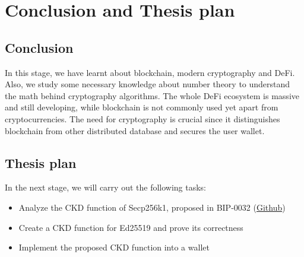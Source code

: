 \chapter{Conclusion and Thesis plan} \label{chap:conclusion}
\minitoc

\section{Conclusion}

In this stage, we have learnt about blockchain, modern cryptography and DeFi. Also, we study some necessary knowledge about number theory to understand the math behind cryptography algorithms. The whole DeFi ecosystem is massive and still developing, while blockchain is not commonly used yet apart from cryptocurrencies. The need for cryptography is crucial since it distinguishes blockchain from other distributed database and secures the user wallet.


\section{Thesis plan}

In the next stage, we will carry out the following tasks:
\begin{itemize}
  \item Analyze the CKD function of Secp256k1, proposed in BIP-0032 (\href{https://github.com/bitcoin/bips/blob/master/bip-0032.mediawiki}{Github})
  \item Create a CKD function for Ed25519 and prove its correctness
  \item Implement the proposed CKD function into a wallet
\end{itemize}